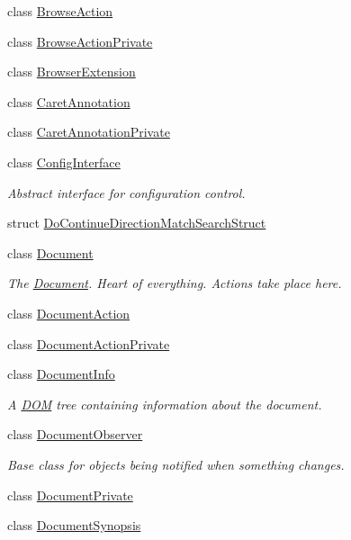 \begin{DoxyCompactItemize}
class \hyperlink{classOkular_1_1BrowseAction}{Browse\+Action}
\item 
class \hyperlink{classOkular_1_1BrowseActionPrivate}{Browse\+Action\+Private}
\item 
class \hyperlink{classOkular_1_1BrowserExtension}{Browser\+Extension}
\item 
class \hyperlink{classOkular_1_1CaretAnnotation}{Caret\+Annotation}
\item 
class \hyperlink{classOkular_1_1CaretAnnotationPrivate}{Caret\+Annotation\+Private}
\item 
class \hyperlink{classOkular_1_1ConfigInterface}{Config\+Interface}
\begin{DoxyCompactList}\small\item\em Abstract interface for configuration control. \end{DoxyCompactList}\item 
struct \hyperlink{structOkular_1_1DoContinueDirectionMatchSearchStruct}{Do\+Continue\+Direction\+Match\+Search\+Struct}
\item 
class \hyperlink{classOkular_1_1Document}{Document}
\begin{DoxyCompactList}\small\item\em The \hyperlink{classOkular_1_1Document}{Document}. Heart of everything. Actions take place here. \end{DoxyCompactList}\item 
class \hyperlink{classOkular_1_1DocumentAction}{Document\+Action}
\item 
class \hyperlink{classOkular_1_1DocumentActionPrivate}{Document\+Action\+Private}
\item 
class \hyperlink{classOkular_1_1DocumentInfo}{Document\+Info}
\begin{DoxyCompactList}\small\item\em A \hyperlink{namespaceDOM}{D\+O\+M} tree containing information about the document. \end{DoxyCompactList}\item 
class \hyperlink{classOkular_1_1DocumentObserver}{Document\+Observer}
\begin{DoxyCompactList}\small\item\em Base class for objects being notified when something changes. \end{DoxyCompactList}\item 
class \hyperlink{classOkular_1_1DocumentPrivate}{Document\+Private}
\item 
class \hyperlink{classOkular_1_1DocumentSynopsis}{Document\+Synopsis}

\end{DoxyCompactItemize}
